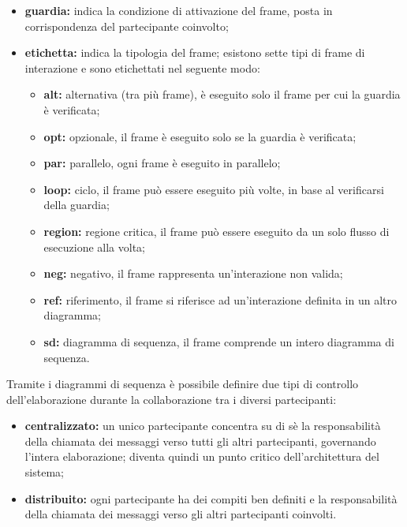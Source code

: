 \begin{itemize}[leftmargin=1.5cm]
							\begin{itemize}
								\item \textbf{guardia:} indica la condizione di attivazione del frame, posta in corrispondenza del partecipante coinvolto;
								\item \textbf{etichetta:} indica la tipologia del frame; esistono sette tipi di frame di interazione e sono etichettati nel seguente modo:
								\begin{itemize}
									\item \textbf{alt:} alternativa (tra più frame), è eseguito solo il frame per cui la guardia è verificata;
									\item \textbf{opt:} opzionale, il frame è eseguito solo se la guardia è verificata;
									\item \textbf{par:} parallelo, ogni frame è eseguito in parallelo;
									\item \textbf{loop:} ciclo, il frame può essere eseguito più volte, in base al verificarsi della guardia;
									\item \textbf{region:} regione critica, il frame può essere eseguito da un solo flusso di esecuzione alla volta;
									\item \textbf{neg:} negativo, il frame rappresenta un'interazione non valida;
									\item \textbf{ref:} riferimento, il frame si riferisce ad un'interazione definita in un altro diagramma;
									\item \textbf{sd:} diagramma di sequenza, il frame comprende un intero diagramma di sequenza.
								\end{itemize}
							\end{itemize}
						\end{itemize}

						\hangindent=0.6cm Tramite i diagrammi di sequenza è possibile definire due tipi di controllo dell'elaborazione durante la collaborazione tra i diversi partecipanti:
						\begin{itemize}[leftmargin=1.5cm]
							\item \textbf{centralizzato:} un unico partecipante concentra su di sè la responsabilità della chiamata dei messaggi verso tutti gli altri partecipanti, governando l'intera elaborazione; diventa quindi un punto critico dell'architettura del sistema;
							\item \textbf{distribuito:} ogni partecipante ha dei compiti ben definiti e la responsabilità della chiamata dei messaggi verso gli altri partecipanti coinvolti.
						\end{itemize}

